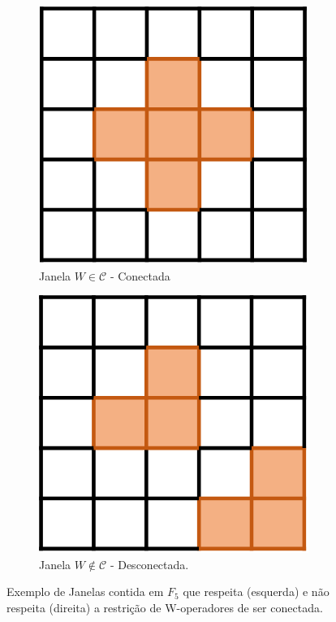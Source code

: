 \begin{figure}
  \centering

  \begin{subfigure}{0.4\textwidth}
    \centering
    \includegraphics[width=.8\textwidth]{figuras/W_conectada.png}
    \caption{Janela $W \in \mathscr{C}$ - Conectada\label{fig:subfig:wconect}}
  \end{subfigure}
  \begin{subfigure}{0.4\textwidth}
    \centering
      \includegraphics[width=.8\textwidth]{figuras/W_nconectada.png}
    \caption{Janela $W \notin \mathscr{C}$ - Desconectada.\label{fig:subfig:wnotconect}}
  \end{subfigure}

  \caption{Exemplo de Janelas contida em $F_{5}$ que respeita (esquerda) e não respeita (direita) a restrição de W-operadores de ser conectada.\label{fig:wconect}}
\end{figure}

